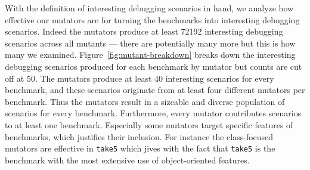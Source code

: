 With the definition of interesting debugging scenarios in hand, we analyze how effective our mutators
are for turning the benchmarks into interesting debugging scenarios.
Indeed the mutators produce at least 72192 interesting debugging scenarios
across all mutants --- there are potentially many more but this is how
many we examined. 
Figure~\ref{fig:mutant-breakdown} breaks down the interesting
debugging scenarios produced  for each benchmark by mutator 
but counts are cut off at 50. The mutators produce at least 40 interesting
scenarios for every benchmark, and these scenarios originate from at
least four different mutators per benchmark.  Thus the mutators result in 
a sizeable and diverse population of scenarios for every benchmark.
Furthermore, every mutator contributes scenarios to at least one
benchmark. Especially some mutators  target specific features of
benchmarks, which
justifies their inclusion. For
instance the class-focused mutators are effective in \texttt{take5}
which jives with the fact that \texttt{take5} is the benchmark with 
the most extensive use of object-oriented features.
